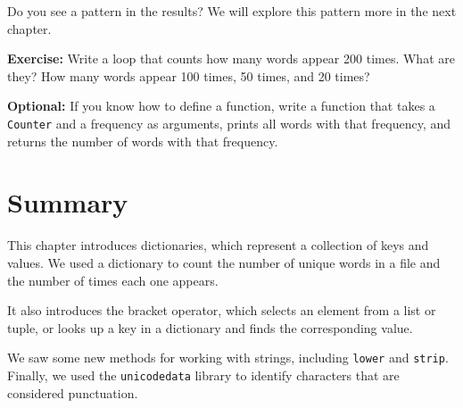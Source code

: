 Do you see a pattern in the results? We will explore this pattern more
in the next chapter.

\textbf{Exercise:} Write a loop that counts how many words appear 200
times. What are they? How many words appear 100 times, 50 times, and 20
times?

\textbf{Optional:} If you know how to define a function, write a
function that takes a \passthrough{\lstinline!Counter!} and a frequency
as arguments, prints all words with that frequency, and returns the
number of words with that frequency.

\hypertarget{summary}{%
\section{Summary}\label{summary}}

This chapter introduces dictionaries, which represent a collection of
keys and values. We used a dictionary to count the number of unique
words in a file and the number of times each one appears.

It also introduces the bracket operator, which selects an element from a
list or tuple, or looks up a key in a dictionary and finds the
corresponding value.

We saw some new methods for working with strings, including
\passthrough{\lstinline!lower!} and \passthrough{\lstinline!strip!}.
Finally, we used the \passthrough{\lstinline!unicodedata!} library to
identify characters that are considered punctuation.

